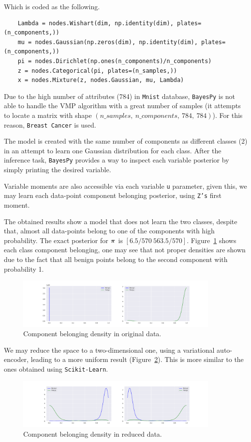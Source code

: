 Which is coded as the following.
\begin{verbatim}
    Lambda = nodes.Wishart(dim, np.identity(dim), plates=(n_components,))
    mu = nodes.Gaussian(np.zeros(dim), np.identity(dim), plates=(n_components,))
    pi = nodes.Dirichlet(np.ones(n_components)/n_components)
    z = nodes.Categorical(pi, plates=(n_samples,))
    x = nodes.Mixture(z, nodes.Gaussian, mu, Lambda)
\end{verbatim}

Due to the high number of attributes (784) in \texttt{Mnist} database, \texttt{BayesPy} is not able to handle the VMP algorithm with a great number of samples (it attempts to locate a matrix with shape \((n\_samples,\ n\_components,\ 784,\ 784)\)). For this reason, \texttt{Breast Cancer} is used.

The model is created with the same number of components as different classes (2) in an attempt to learn one Gaussian distribution for each class. After the inference task, \texttt{BayesPy} provides a way to inspect each variable posterior by simply printing the desired variable.

Variable moments are also accessible via each variable \texttt{u} parameter, given this, we may learn each data-point component belonging posterior, using \texttt{Z's} first moment.

The obtained results show a model that does not learn the two classes, despite that, almost all data-points belong to one of the components with high probability. The exact posterior for \(\bm{\pi}\) is \([6.5/570\  563.5/570]\).  Figure~\ref{fig:proba_original_bayes} shows each class component belonging, one may see that not proper densities are shown due to the fact that all benign points belong to the second component with probability 1.

\begin{figure}[h!]
  \centering
  \includegraphics[width=0.9\textwidth]{tex/images/proba_original_bayes.pdf}
  \caption{Component belonging density in original data.}\label{fig:proba_original_bayes}
\end{figure}

We may reduce the space to a two-dimensional one, using a variational auto-encoder, leading to a more uniform result (Figure~\ref{fig:proba_reduced_bayes}). This is more similar to the ones obtained using \texttt{Scikit-Learn}.
 
\begin{figure}[h!]
  \centering
  \includegraphics[width=0.9\textwidth]{tex/images/proba_reduced_bayes.pdf}
  \caption{Component belonging density in reduced data.}\label{fig:proba_reduced_bayes}
\end{figure}

